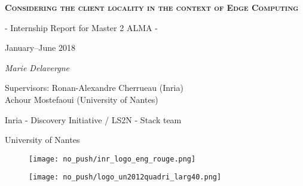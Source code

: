 \documentclass[a4paper, 10pt, titlepage]{report}
\begin{document}
%
{}

\begin{titlepage}
  \centering
      {\scshape\LARGE\bfseries Considering the client locality in the context of Edge Computing \par}
      \vspace{1cm}
             {\Large - Internship Report for Master 2 ALMA -\par}
             {\Large January--June 2018 \par}
             \vspace{1.5cm}
               	    {\Large\itshape Marie Delavergne\par}

	            \vfill


                    {\large Supervisors: Ronan-Alexandre Cherrueau (Inria)\\
                      \hspace{3.45cm}Achour Mostefaoui (University of Nantes)\par}
                          \vspace{2cm}
                    {\large Inria - Discovery Initiative / LS2N - Stack team\par}
	            {\large University of Nantes\par}
                          \vspace{0.5cm}
                    \begin{figure}[!h]\centering
                      \begin {minipage}{0.3\textwidth}                        \centerline{\texttt{[image: no\_push/inr\_logo\_eng\_rouge.png]}}
                        \label{Fig:inria}
                      \end{minipage}
                      \begin{minipage}{0.3\textwidth}                   \centerline{\texttt{[image: no\_push/logo\_un2012quadri\_larg40.png]}}
                        \label{Fig:univnantes}
                      \end{minipage}


                    \end{figure}


\end{titlepage}
\restoregeometry
\end{document}
